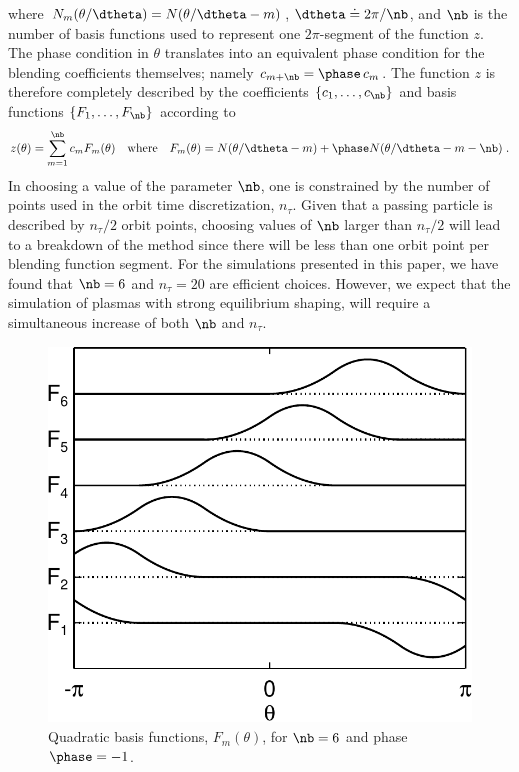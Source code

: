 \noindent
where $N_m(\theta/\dtheta) = N(\theta/\dtheta - m)$, 
$\dtheta \doteq 2\pi/\nb$, and $\nb$ is the number of basis 
functions used to represent one $2\pi$-segment of the 
function $z$.  The phase condition in $\theta$ translates into an 
equivalent phase condition for the blending coefficients 
themselves; namely 
$c_{m+\nb} = \phase \, c_m$.  The function $z$ 
is therefore completely described by the coefficients 
$\left\{c_1, \ldots, c_\nb\right\}$ and basis functions 
$\left\{F_1, \ldots, F_\nb\right\}$ according to
%
\begin{equation}
z(\theta) = \sum_{m=1}^\nb c_m F_m(\theta)
\quad\hbox{where}\quad
F_m (\theta) = N(\theta/\dtheta-m) + \phase N(\theta/\dtheta-m-\nb) \; .
\label{blendf}
\end{equation}
%
In choosing a value of the parameter $\nb$, 
one is constrained by the number of points used in the 
orbit time discretization, $n_\tau$.  Given that a passing 
particle is described by $n_\tau/2$ orbit points, choosing 
values of $\nb$ larger than $n_\tau/2$ will lead to a 
breakdown of the method since there will be less than 
one orbit point per blending function segment.  For the 
simulations presented in this paper, we have found that 
$\nb=6$ and $n_\tau=20$ are efficient choices.  However, we 
expect that the simulation of plasmas with strong equilibrium 
shaping, will require a simultaneous increase of both 
$\nb$ and $n_\tau$.  

\begin{figure}
\begin{center}
\includegraphics[scale=0.65]{figures/blend_f.pdf}
\end{center}
\caption{Quadratic basis functions, $F_m (\theta)$, for 
$\nb=6$ and phase $\phase=-1$.}
\label{fig.blendf}
\end{figure}

